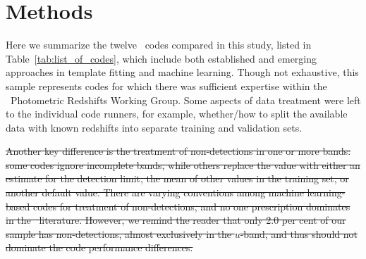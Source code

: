 \section{Methods}
\label{sec:pzcodes}

Here we summarize the twelve \pzpdf\ codes compared in this study, listed in Table~\ref{tab:list_of_codes}, which include both established and emerging approaches in template fitting and machine learning.
Though not exhaustive, this sample represents codes for which there was sufficient expertise within the \lsstdesc\ Photometric Redshifts Working Group.
Some aspects of data treatment were left to the individual code runners, for example, whether/how to split the available data with known redshifts into separate training and validation sets.

\sout{Another key difference is the treatment of non-detections in one or more bands: some codes ignore incomplete bands, while others replace the value with either an estimate for the detection limit, the mean of other values in the training set, or another default value.
There are varying conventions among machine learning-based codes for treatment of non-detections, and no one prescription dominates in the \pz\ literature.
However, we remind the reader that only 2.0 per cent of our sample has non-detections, almost exclusively in the $u$-band, and thus should not dominate the code performance differences.}


